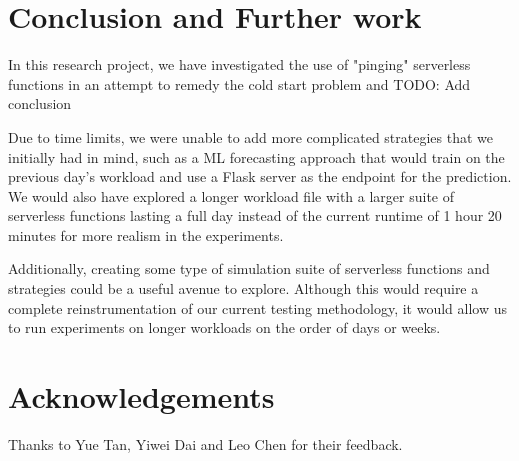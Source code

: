 \documentclass{article}
\begin{document}
\section{Conclusion and Further work}

In this research project, we have investigated the use of "pinging" serverless functions in an attempt to remedy the cold start problem and TODO: Add conclusion

Due to time limits, we were unable to add more complicated strategies that we initially had in mind, such as a ML forecasting approach that would train on the previous day's workload and use a Flask server as the endpoint for the prediction. We would also have explored a longer workload file with a larger suite of serverless functions lasting a full day instead of the current runtime of 1 hour 20 minutes for more realism in the experiments.

Additionally, creating some type of simulation suite of serverless functions and strategies could be a useful avenue to explore. Although this would require a complete reinstrumentation of our current testing methodology, it would allow us to run experiments on longer workloads on the order of days or weeks.

\section{Acknowledgements}

Thanks to Yue Tan, Yiwei Dai and Leo Chen for their feedback.



\end{document}
